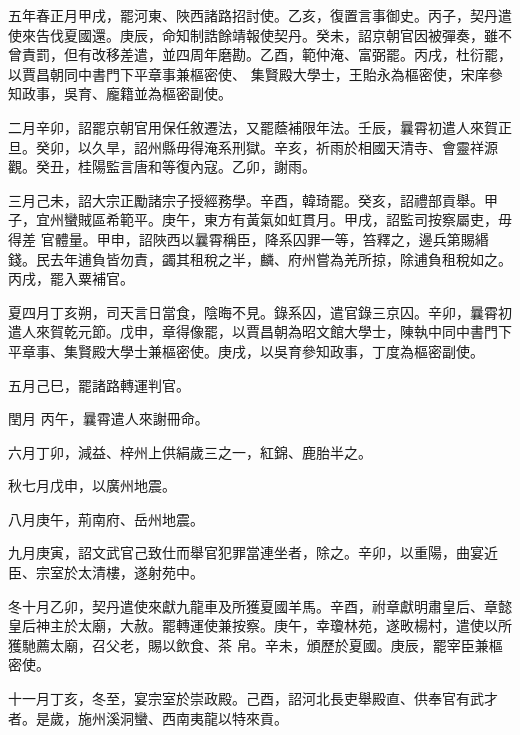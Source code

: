 \begin{pinyinscope}
 五年春正月甲戌，罷河東、陜西諸路招討使。乙亥，復置言事御史。丙子，契丹遣使來告伐夏國還。庚辰，命知制誥餘靖報使契丹。癸未，詔京朝官因被彈奏，雖不曾責罰，但有改移差遣，並四周年磨勘。乙酉，範仲淹、富弼罷。丙戌，杜衍罷，以賈昌朝同中書門下平章事兼樞密使、
 集賢殿大學士，王貽永為樞密使，宋庠參知政事，吳育、龐籍並為樞密副使。



 二月辛卯，詔罷京朝官用保任敘遷法，又罷蔭補限年法。壬辰，曩霄初遣人來賀正旦。癸卯，以久旱，詔州縣毋得淹系刑獄。辛亥，祈雨於相國天清寺、會靈祥源觀。癸丑，桂陽監言唐和等復內寇。乙卯，謝雨。



 三月己未，詔大宗正勵諸宗子授經務學。辛酉，韓琦罷。癸亥，詔禮部貢舉。甲子，宜州蠻賊區希範平。庚午，東方有黃氣如虹貫月。甲戌，詔監司按察屬吏，毋得差
 官體量。甲申，詔陜西以曩霄稱臣，降系囚罪一等，笞釋之，邊兵第賜緡錢。民去年逋負皆勿責，蠲其租稅之半，麟、府州嘗為羌所掠，除逋負租稅如之。丙戌，罷入粟補官。



 夏四月丁亥朔，司天言日當食，陰晦不見。錄系囚，遣官錄三京囚。辛卯，曩霄初遣人來賀乾元節。戊申，章得像罷，以賈昌朝為昭文館大學士，陳執中同中書門下平章事、集賢殿大學士兼樞密使。庚戌，以吳育參知政事，丁度為樞密副使。



 五月己巳，罷諸路轉運判官。



 閏月
 丙午，曩霄遣人來謝冊命。



 六月丁卯，減益、梓州上供絹歲三之一，紅錦、鹿胎半之。



 秋七月戊申，以廣州地震。



 八月庚午，荊南府、岳州地震。



 九月庚寅，詔文武官己致仕而舉官犯罪當連坐者，除之。辛卯，以重陽，曲宴近臣、宗室於太清樓，遂射苑中。



 冬十月乙卯，契丹遣使來獻九龍車及所獲夏國羊馬。辛酉，祔章獻明肅皇后、章懿皇后神主於太廟，大赦。罷轉運使兼按察。庚午，幸瓊林苑，遂畋楊村，遣使以所獲馳薦太廟，召父老，賜以飲食、茶
 帛。辛未，頒歷於夏國。庚辰，罷宰臣兼樞密使。



 十一月丁亥，冬至，宴宗室於崇政殿。己酉，詔河北長吏舉殿直、供奉官有武才者。是歲，施州溪洞蠻、西南夷龍以特來貢。




\end{pinyinscope}
